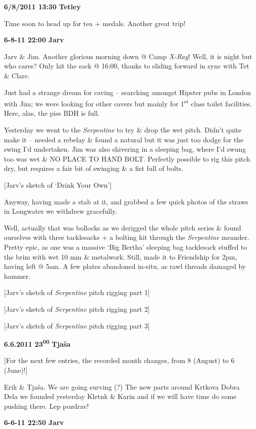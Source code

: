 \textbf{6/8/2011 13:30 Tetley}

Time soon to head up for tea + medals. Another great trip!

\textbf{6-8-11 22:00 Jarv}

Jarv \& Jim. Another glorious morning down @ Camp \emph{X-Ray}! Well, it
is night but who cares? Only hit the sack @ 16:00, thanks to sliding
forward in sync with Tet \& Clare.

Just had a strange dream for caving -- searching amongst Hipster pubs in
London with Jim; we were looking for other cavers but mainly for
1\textsuperscript{st} class toilet facilities. Here, alas, the piss BDH
is full.

Yesterday we went to the \emph{Serpentine} to try \& drop the wet pitch.
Didn't quite make it -- needed a rebelay \& found a natural but it was
just too dodge for the swing I'd undertaken. Jim was also shivering in a
sleeping bag, where I'd swung too was wet \& NO PLACE TO HAND BOLT.
Perfectly possible to rig this pitch dry, but requires a fair bit of
swinging \& a fist full of bolts.

{[}Jarv's sketch of `Drink Your Own'{]}

Anyway, having made a stab at it, and grabbed a few quick photos of the
straws in Longwater we withdrew gracefully.

Well, actually that was bollocks as we derigged the whole pitch series
\& found ourselves with three tacklesacks + a bolting kit through the
\emph{Serpentine} meander. Pretty epic, as one was a massive `Big
Bertha' sleeping bag tacklesack stuffed to the brim with wet 10 mm \&
metalwork. Still, made it to Friendship for 2pm, having left @ 5am. A
few plates abandoned in-situ, as rawl threads damaged by hammer.

{[}Jarv's sketch of \emph{Serpentine} pitch rigging part 1{]}

{[}Jarv's sketch of \emph{Serpentine} pitch rigging part 2{]}

{[}Jarv's sketch of \emph{Serpentine} pitch rigging part 3{]}

\textbf{6.6.2011 23\textsuperscript{00}} \textbf{Tjaša}

{[}For the next few entries, the recorded month changes, from 8 (August)
to 6 (June)!{]}

Erik \& Tjaša. We are going surving (?) The new parts around Krtkova
Dobra Dela we founded yesterday Kletnk \& Karin and if we will have time
do some pushing there. Lep pozdrav!

\textbf{6-6-11 22:50 Jarv}

